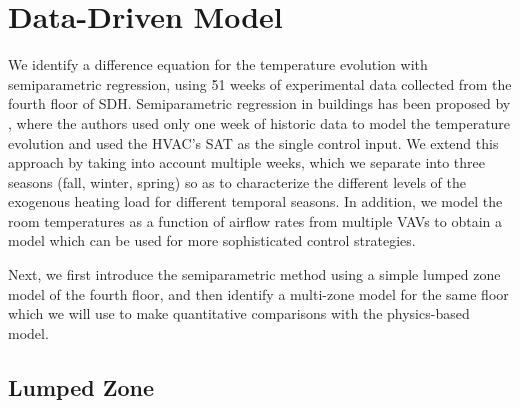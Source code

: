 
\section{Data-Driven Model}
\label{sec:Data_Driven_Model}
We identify a difference equation for the temperature evolution with semiparametric regression, using 51 weeks of experimental data collected from the fourth floor of SDH. Semiparametric regression in buildings has been proposed by \cite{Aswani:2012aa}, where the authors used only one week of historic data to model the temperature evolution and used the HVAC's SAT as the single control input. %
We extend this approach by taking into account multiple weeks, which we separate into three seasons (fall, winter, spring) so as to characterize the different levels of the exogenous heating load for different temporal seasons. 
In addition, we model the room temperatures as a function of airflow rates from multiple VAVs to obtain a model which can be used for more sophisticated control strategies.

Next, we first introduce the semiparametric method using a simple lumped zone model of the fourth floor, and then identify a multi-zone model for the same floor which we will use to make quantitative comparisons with the physics-based model.

\subsection{Lumped Zone}
\label{sec:Lumped_Zone}
